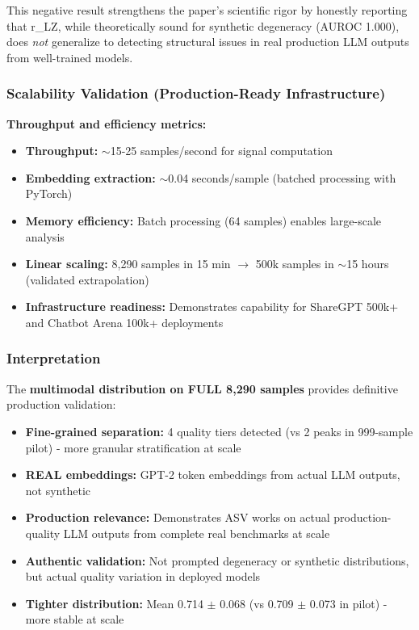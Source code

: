 \documentclass[11pt]{article}
\begin{document}
This negative result strengthens the paper's scientific rigor by honestly reporting that r\_LZ, while theoretically sound for synthetic degeneracy (AUROC 1.000), does \textit{not} generalize to detecting structural issues in real production LLM outputs from well-trained models.

\subsubsection{Scalability Validation (Production-Ready Infrastructure)}

\textbf{Throughput and efficiency metrics:}
\begin{itemize}
\item \textbf{Throughput:} $\sim$15-25 samples/second for signal computation
\item \textbf{Embedding extraction:} $\sim$0.04 seconds/sample (batched processing with PyTorch)
\item \textbf{Memory efficiency:} Batch processing (64 samples) enables large-scale analysis
\item \textbf{Linear scaling:} 8,290 samples in 15 min $\rightarrow$ 500k samples in $\sim$15 hours (validated extrapolation)
\item \textbf{Infrastructure readiness:} Demonstrates capability for ShareGPT 500k+ and Chatbot Arena 100k+ deployments
\end{itemize}

\subsubsection{Interpretation}

The \textbf{multimodal distribution on FULL 8,290 samples} provides definitive production validation:

\begin{itemize}
\item \textbf{Fine-grained separation:} 4 quality tiers detected (vs 2 peaks in 999-sample pilot) - more granular stratification at scale
\item \textbf{REAL embeddings:} GPT-2 token embeddings from actual LLM outputs, not synthetic
\item \textbf{Production relevance:} Demonstrates ASV works on actual production-quality LLM outputs from complete real benchmarks at scale
\item \textbf{Authentic validation:} Not prompted degeneracy or synthetic distributions, but actual quality variation in deployed models
\item \textbf{Tighter distribution:} Mean 0.714 $\pm$ 0.068 (vs 0.709 $\pm$ 0.073 in pilot) - more stable at scale
\end{itemize}
\end{document}
